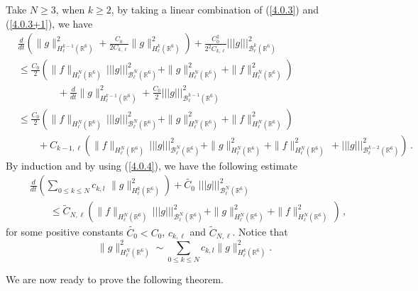 \documentclass{amsart}[12pt, article]
\begin{document}
Take $N\ge 3$, when $k\ge 2$,  by taking a linear combination of
  (\ref{4.0.3}) and  (\ref{4.0.3+1}), we have
\begin{align*}
&\frac{d}{d t}\left(\|g\|^2_{H^{k-1}_\ell({{{\mathbb R}}}^6)}+\frac{C_0}{2 C_{k,
\ell}}\|g\|^2_{H^k_\ell({{{\mathbb R}}}^6)}\right)+\frac{C^2_0}{2^2 C_{k, \ell}}
|||g|||^2_{{{\mathcal B}}^{k}_\ell({{{\mathbb R}}}^6)}\\
&\leq \frac{C_0}{2}\left( \|f\|_{H^N_\ell({{{\mathbb R}}}^6)} \,
|||g|||^2_{{{\mathcal B}}^{N}_\ell({{{\mathbb R}}}^6)}+
\|g\|^2_{H^{N}_\ell({{{\mathbb R}}}^6)}+ \|f\|^2_{H^N_\ell({{{\mathbb R}}}^6)}\right)\\
&\qquad\qquad+ \frac{d}{dt}\|g\|^2_{H^{k-1}_\ell({{{\mathbb R}}}^6)}+\frac{C_0}{2}|||g|||^2_{{{\mathcal B}}^{k-1}_\ell({{{\mathbb R}}}^6)}
\\
&\leq \frac{C_0}{2}\left( \|f\|_{H^N_\ell({{{\mathbb R}}}^6)} \,
|||g|||^2_{{{\mathcal B}}^{N}_\ell({{{\mathbb R}}}^6)}+ \|g\|^2_{H^{N}_\ell({{{\mathbb R}}}^6)}+
\|f\|^2_{H^N_\ell({{{\mathbb R}}}^6)}\right)\\
&\qquad+C_{k-1, \ell}\left( \|f\|_{H^N_\ell({{{\mathbb R}}}^6)} \,
|||g|||^2_{{{\mathcal B}}^{N}_\ell({{{\mathbb R}}}^6)} +\|g\|^2_{H^{N}_\ell({{{\mathbb R}}}^6)}+
\|f\|^2_{H^N_\ell({{{\mathbb R}}}^6)} \, +|||g|||^2_{{{\mathcal B}}^{k-2}_\ell({{{\mathbb R}}}^6)}
 \right)
\, .
\end{align*}
By induction and by using (\ref{4.0.4}), we have the
following  estimate
\begin{align}\label{4.0.5}
&\frac{d}{d t}\left(\sum_{0\leq k\leq N}c_{k,
l}\,\,\|g\|^2_{H^k_\ell({{{\mathbb R}}}^6)}\right)+\widetilde{C_0}\,\,
|||g|||^2_{{{\mathcal B}}^{N}_\ell({{{\mathbb R}}}^6)}\\
&\qquad\leq \widetilde C_{N, \ell} \left(\|f\|_{H^N_\ell({{{\mathbb R}}}^6)} \,
|||g|||^2_{{{\mathcal B}}^{N}_\ell({{{\mathbb R}}}^6)}+\|g\|^2_{H^{N}_\ell({{{\mathbb R}}}^6)}+
\|f\|^2_{H^N_\ell({{{\mathbb R}}}^6)} \,
 \right)\,,\nonumber
\end{align}
for some positive constants $\widetilde{C_0}<C_0$, $c_{k, \ell}$ and $\widetilde C_{N, \ell}$. Notice that
\begin{equation}\label{4.0.6}
\|g\|^2_{H^N_\ell({{{\mathbb R}}}^6)}\sim \sum_{0\leq k\leq N}c_{k,
l}\|g\|^2_{H^k_\ell({{{\mathbb R}}}^6)}.
\end{equation}

We are now ready to prove the following theorem.
\end{document}
